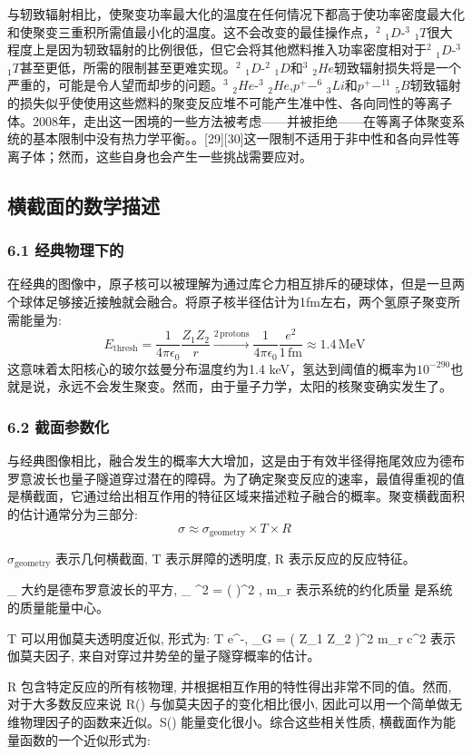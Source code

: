 与轫致辐射相比，使聚变功率最大化的温度在任何情况下都高于使功率密度最大化和使聚变三重积所需值最小化的温度。这不会改变的最佳操作点，$^{2}$ $_{1}D$-$^{3}$ $_{1}T$很大程度上是因为轫致辐射的比例很低，但它会将其他燃料推入功率密度相对于$^{2}$ $_{1}D$-$^{3}$ $_{1}T$甚至更低，所需的限制甚至更难实现。$^{2}$ $_{1}D$-$^{2}$ $_{1}D$和$^{3}$ $_{2}He$轫致辐射损失将是一个严重的，可能是令人望而却步的问题。$^{3}$ $_{2}He$-$^{3}$ $_{2}He$,$p^{+}-^{6}$ $_{3}Li$和$p^{+}-^{11}$ $_{5}B$轫致辐射的损失似乎使使用这些燃料的聚变反应堆不可能产生准中性、各向同性的等离子体。2008年，走出这一困境的一些方法被考虑——并被拒绝——在等离子体聚变系统的基本限制中没有热力学平衡。。[29][30]这一限制不适用于非中性和各向异性等离子体；然而，这些自身也会产生一些挑战需要应对。

\subsection{ 横截面的数学描述}
\subsubsection{6.1 经典物理下的}
在经典的图像中，原子核可以被理解为通过库仑力相互排斥的硬球体，但是一旦两个球体足够接近接触就会融合。将原子核半径估计为1fm左右，两个氢原子聚变所需能量为:
$$E_{\text{thresh}} = \frac{1}{4\pi \epsilon_0} \frac{Z_1 Z_2}{r} \xrightarrow{2 \, \text{protons}} \frac{1}{4\pi \epsilon_0} \frac{e^2}{1 \, \text{fm}} \approx 1.4 \, \text{MeV}~$$
这意味着太阳核心的玻尔兹曼分布温度约为1.4 keV，氢达到阈值的概率为$10^{-290}$也就是说，永远不会发生聚变。然而，由于量子力学，太阳的核聚变确实发生了。
\subsubsection{6.2 截面参数化}
与经典图像相比，融合发生的概率大大增加，这是由于有效半径得拖尾效应为德布罗意波长也量子隧道穿过潜在的障碍。为了确定聚变反应的速率，最值得重视的值是横截面，它通过给出相互作用的特征区域来描述粒子融合的概率。聚变横截面积的估计通常分为三部分:
$$\sigma \approx \sigma_{\text{geometry}} \times T \times R~$$

$\sigma_{\text{geometry}}$ 表示几何横截面, T 表示屏障的透明度, R 表示反应的反应特征。

\sigma_{} 大约是德布罗意波长的平方, 
\sigma_{} \approx \lambda^2 = \left(  \right)^2 \propto {}, 
m_r 表示系统的约化质量 \epsilon 是系统的质量能量中心。

T 可以用伽莫夫透明度近似, 形式为: T \approx e^{-}, 
\epsilon_G = \left( \pi \alpha Z_1 Z_2 \right)^2  m_r c^2 表示伽莫夫因子, 来自对穿过井势垒的量子隧穿概率的估计。

R 包含特定反应的所有核物理, 并根据相互作用的特性得出非常不同的值。然而, 对于大多数反应来说 R(\epsilon) 与伽莫夫因子的变化相比很小, 因此可以用一个简单做无维物理因子的函数来近似。S(\epsilon) 能量变化很小。综合这些相关性质, 横截面作为能量函数的一个近似形式为: